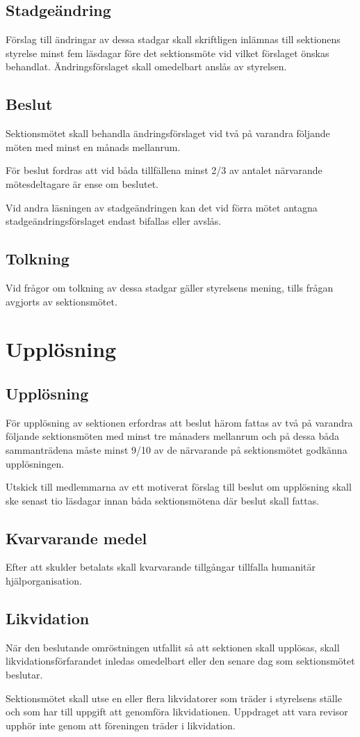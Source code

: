 \documentclass{datateknologsektionen-document}
\begin{document}
\subsection{Stadgeändring}
Förslag till ändringar av dessa stadgar skall skriftligen inlämnas till sektionens styrelse
minst fem läsdagar före det sektionsmöte vid vilket förslaget önskas behandlat.
Ändringsförslaget skall omedelbart anslås av styrelsen.

\subsection{Beslut}
Sektionsmötet skall behandla ändringsförslaget vid två på varandra följande möten med
minst en månads mellanrum.

För beslut fordras att vid båda tillfällena minst 2/3 av antalet närvarande mötesdeltagare
är ense om beslutet.

Vid andra läsningen av stadgeändringen kan det vid förra mötet antagna
stadgeändringsförslaget endast bifallas eller avslås.

\subsection{Tolkning}
Vid frågor om tolkning av dessa stadgar gäller styrelsens mening, tills frågan avgjorts av
sektionsmötet.

\section{Upplösning}
\subsection{Upplösning}
För upplösning av sektionen erfordras att beslut härom fattas av två på varandra följande
sektionsmöten med minst tre månaders mellanrum och på dessa båda sammanträdena
måste minst 9/10 av de närvarande på sektionsmötet godkänna upplösningen.

Utskick till medlemmarna av ett motiverat förslag till beslut om upplösning skall ske
senast tio läsdagar innan båda sektionsmötena där beslut skall fattas.

\subsection{Kvarvarande medel}
Efter att skulder betalats skall kvarvarande tillgångar tillfalla humanitär
hjälporganisation.

\subsection{Likvidation}
När den beslutande omröstningen utfallit så att sektionen skall upplösas, skall
likvidationsförfarandet inledas omedelbart eller den senare dag som sektionsmötet
beslutar.

Sektionsmötet skall utse en eller flera likvidatorer som träder i styrelsens ställe och som
har till uppgift att genomföra likvidationen. Uppdraget att vara revisor upphör inte genom
att föreningen träder i likvidation.
\end{document}
